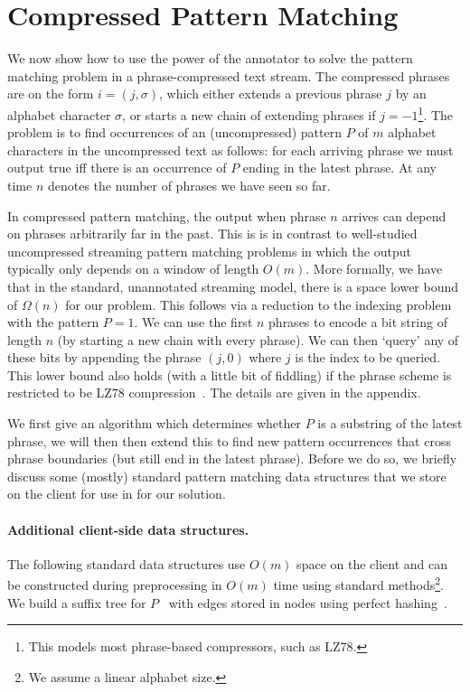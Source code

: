 \section{Compressed Pattern Matching}
We now show how to use the power of the annotator to solve the pattern matching problem in a phrase-compressed text stream. The compressed phrases are on the form $i = (j, \sigma)$, which either extends a previous phrase $j$ by an alphabet character $\sigma$, or starts a new chain of extending phrases if $j = -1$\footnote{This models most phrase-based compressors, such as LZ78.}. 
    The problem is to find occurrences of an (uncompressed) pattern $P$ of $m$ alphabet characters in the uncompressed text as follows: for each arriving phrase we must output true iff there is an occurrence of $P$ ending in the latest phrase. At any time $n$ denotes the number of phrases we have seen so far. 
   
In compressed pattern matching, the output when phrase $n$ arrives can depend on phrases arbitrarily far in the past. This is is in contrast to well-studied uncompressed streaming pattern matching problems in which the output typically only depends on a window of length $O(m)$. More formally, we have that in the standard, unannotated streaming model, there is a space lower bound of $\Omega(n)$ for our problem. This follows via a reduction to the indexing problem with the pattern $P=1$. We can use the first $n$ phrases to encode a bit string of length $n$ (by starting a new chain with every phrase). We can then `query' any of these bits by appending the phrase $(j,0)$ where $j$ is the index to be queried. This lower bound also holds (with a little bit of fiddling) if the phrase scheme is restricted to be LZ78 compression~\cite{lz1978}. The details are given in the appendix.


We first give an algorithm which determines whether $P$ is a substring of the latest phrase, we will then then extend this to find new pattern occurrences that cross phrase boundaries (but still end in the latest phrase). Before we do so, we briefly discuss some (mostly) standard pattern matching data structures that we store on the client for use in for our solution.

\paragraph{Additional client-side data structures.} The following standard data structures use $O(m)$ space on the client and can be constructed during preprocessing in $O(m)$ time using standard methods\footnote{We assume a linear alphabet size.}. We build a suffix tree for $P$~\cite{Weiner1973} with edges stored in nodes using perfect hashing~\cite{fredman1984storing}. %

